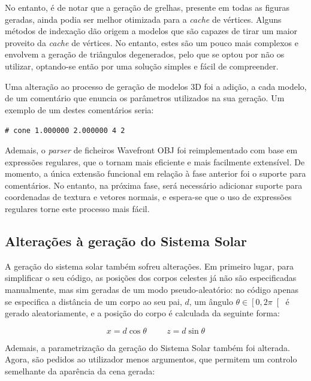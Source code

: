 \documentclass[12pt, a4paper]{article}
\begin{document}

No entanto, é de notar que a geração de grelhas, presente em todas as figuras geradas, ainda podia
ser melhor otimizada para a \emph{cache} de vértices. Alguns métodos de indexação
\cite{optimal-grid} dão origem a modelos que são capazes de tirar um maior proveito da \emph{cache}
de vértices. No entanto, estes são um pouco mais complexos e envolvem a geração de triângulos
degenerados, pelo que se optou por não os utilizar, optando-se então por uma solução simples e fácil
de compreender.

Uma alteração ao processo de geração de modelos 3D foi a adição, a cada modelo, de um comentário que
enuncia os parâmetros utilizados na sua geração. Um exemplo de um destes comentários seria:

\begin{center}
\texttt{\# cone 1.000000 2.000000 4 2}
\end{center}

Ademais, o \emph{parser} de ficheiros Wavefront OBJ foi reimplementado com base em expressões
regulares, que o tornam mais eficiente e mais facilmente extensível. De momento, a única extensão
funcional em relação à fase anterior foi o suporte para comentários. No entanto, na próxima fase,
será necessário adicionar suporte para coordenadas de textura e vetores normais, e espera-se que o
uso de expressões regulares torne este processo mais fácil.

\subsection{Alterações à geração do Sistema Solar}

A geração do sistema solar também sofreu alterações. Em primeiro lugar, para simplificar o seu
código, as posições dos corpos celestes já não são especificadas manualmente, mas sim geradas de um
modo pseudo-aleatório: no código apenas se especifica a distância de um corpo ao seu pai, $d$, um
ângulo $\theta \in \left [ 0, 2\pi \right [$ é gerado aleatoriamente, e a posição do corpo é
calculada da seguinte forma:

$$
x = d \cos \theta
\hspace{1cm}
z = d \sin \theta
$$

Ademais, a parametrização da geração do Sistema Solar também foi alterada. Agora, são pedidos ao
utilizador menos argumentos, que permitem um controlo semelhante da aparência da cena gerada:
\end{document}
